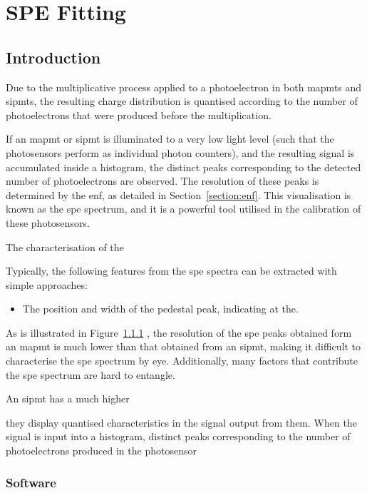 \chapter{\label{a3-spe}SPE Fitting}

\minitoc

\section{Introduction}

Due to the multiplicative process applied to a photoelectron in both \glspl{mapmt} and \glspl{sipmt}, the resulting charge distribution is quantised according to the number of photoelectrons that were produced before the multiplication. 

If an \gls{mapmt} or \gls{sipmt} is illuminated to a very low light level (such that the photosensors perform as individual photon counters), and the resulting signal is accumulated inside a histogram, the distinct peaks corresponding to the detected number of photoelectrons are observed. The resolution of these peaks is determined by the \gls{enf}, as detailed in Section~\ref{section:enf}. This visualisation is known as the \gls{spe} spectrum, and it is a powerful tool utilised in the calibration of these photosensors.

The characterisation of the 

Typically, the following features from the \gls{spe} spectra can be extracted with simple approaches:
\begin{itemize}
\item The position and width of the pedestal peak, indicating at the.
\end{itemize}

As is illustrated in Figure~\ref{} , the resolution of the \gls{spe} peaks obtained form an \gls{mapmt} is much lower than that obtained from an \gls{sipmt}, making it difficult to characterise the \gls{spe} spectrum by eye. Additionally, many factors that contribute the \gls{spe} spectrum are hard to entangle.


An \gls{sipmt} has a much higher 


they display quantised characteristics in the signal output from them. When the signal is input into a histogram, distinct peaks corresponding to the number of photoelectrons produced in the photosensor 

\subsection{Software}

